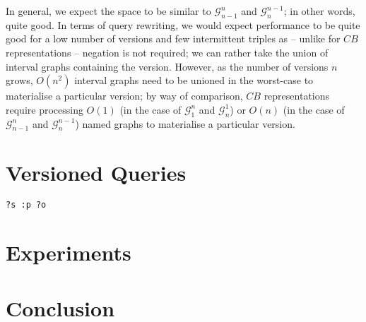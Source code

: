 \documentclass{llncs}
\begin{document}
In general, we expect the space to be similar to $\mathcal{G}^n_{n-1}$ and $\mathcal{G}^{n-1}_n$; in other words, quite good. In terms of query rewriting, we would expect performance to be quite good for a low number of versions and few intermittent triples as -- unlike for $CB$ representations -- negation is not required; we can rather take the union of interval graphs containing the version. However, as the number of versions $n$ grows, $O(n^2)$ interval graphs need to be unioned in the worst-case to materialise a particular version; by way of comparison, $CB$ representations require processing $O(1)$ (in the case of $\mathcal{G}^n_1$ and $\mathcal{G}^1_n$) or $O(n)$ (in the case of $\mathcal{G}^n_{n-1}$ and $\mathcal{G}^{n-1}_n$) named graphs to materialise a particular version. 



\section{Versioned Queries}

\begin{verbatim}
?s :p ?o
\end{verbatim}

\section{Experiments} 

\section{Conclusion}
\newpage


\end{document}
